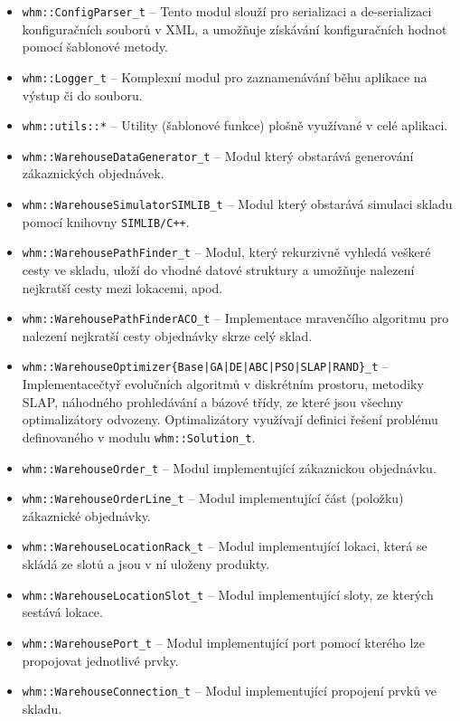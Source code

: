 \begin{itemize}
    \item \texttt{whm::ConfigParser\_t} -- Tento modul slouží pro serializaci a de-serializaci konfiguračních souborů v XML, a umožňuje získávání konfiguračních hodnot pomocí šablonové metody.
    \item \texttt{whm::Logger\_t} -- Komplexní modul pro zaznamenávání běhu aplikace na výstup či do souboru.
    \item \texttt{whm::utils::*} -- Utility (šablonové funkce) plošně využívané v celé aplikaci.
    \item \texttt{whm::WarehouseDataGenerator\_t} -- Modul který obstarává generování zákaznických objednávek.
    \item \texttt{whm::WarehouseSimulatorSIMLIB\_t} -- Modul který obstarává simulaci skladu pomocí knihovny \texttt{SIMLIB/C++}.
    \item \texttt{whm::WarehousePathFinder\_t} -- Modul, který rekurzivně vyhledá veškeré cesty ve skladu, uloží do vhodné datové struktury a umožňuje nalezení nejkratší cesty mezi lokacemi, apod.
    \item \texttt{whm::WarehousePathFinderACO\_t} -- Implementace mravenčího algoritmu pro nalezení nejkratší cesty objednávky skrze celý sklad.
    \item \texttt{whm::WarehouseOptimizer\{Base|GA|DE|ABC|PSO|SLAP|RAND\}\_t} -- Implementace\newline čtyř evolučních algoritmů v diskrétním prostoru, metodiky SLAP, náhodného prohledávání a bázové třídy, ze které jsou všechny optimalizátory odvozeny. Optimalizátory využívají definici řešení problému definovaného v modulu \texttt{whm::Solution\_t}.
    \item \texttt{whm::WarehouseOrder\_t} -- Modul implementující zákaznickou objednávku.
    \item \texttt{whm::WarehouseOrderLine\_t} -- Modul implementující část (položku) zákaznické objednávky.
    \item \texttt{whm::WarehouseLocationRack\_t} -- Modul implementující lokaci, která se skládá ze slotů a jsou v ní uloženy produkty.
    \item \texttt{whm::WarehouseLocationSlot\_t} -- Modul implementující sloty, ze kterých sestává lokace.
    \item \texttt{whm::WarehousePort\_t} -- Modul implementující port pomocí kterého lze propojovat jednotlivé prvky.
    \item \texttt{whm::WarehouseConnection\_t} -- Modul implementující propojení prvků ve skladu.

\end{itemize}
